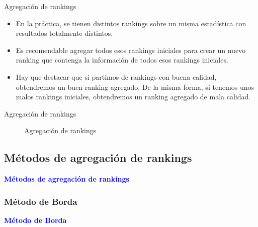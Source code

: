 \documentclass[10pt,hyperref={unicode}]{beamer}
\begin{document}
	\begin{frame}{Agregación de rankings}
		
		\begin{itemize}
		\item En la práctica, se tienen distintos rankings sobre un misma estadística con resultados totalmente distintos.\\
		
		\item Es recomendable agregar todos esos rankings iniciales para crear un nuevo ranking que contenga la información de todos esos rankings iniciales.\\
		
		\item Hay que destacar que si partimos de rankings con buena calidad, obtendremos un buen ranking agregado. De la misma forma, si tenemos unos malos rankings iniciales, obtendremos un ranking agregado de mala calidad.
		\end{itemize}
	\end{frame}
	
	\begin{frame}{Agregación de rankings}
		\begin{figure}
			\centering
			\agregacionrankings
			\caption{Agregación de rankings}
			\label{fig:agregación_rankings}
		\end{figure}
	\end{frame}
	
	\subsection{Métodos de agregación de rankings}
	
	\begin{frame}
		\begin{center}
			\Huge\textbf{\textsf{\textcolor{blue}{Métodos de agregación de rankings}}}
		\end{center}
	\end{frame}
	
	\subsubsection{Método de Borda}
	
	\begin{frame}
		\begin{center}
			\Huge\textbf{\textsf{\textcolor{blue}{Método de Borda}}}
		\end{center}
	\end{frame}
	
\end{document}
